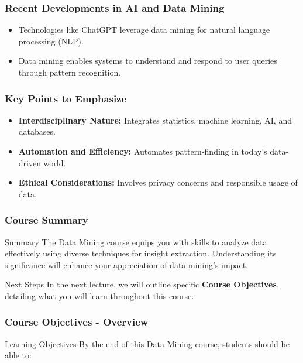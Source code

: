 \documentclass[aspectratio=169]{beamer}
\begin{document}
\begin{frame}[fragile]
    \frametitle{Recent Developments in AI and Data Mining}
    \begin{itemize}
        \item Technologies like ChatGPT leverage data mining for natural language processing (NLP).
        \item Data mining enables systems to understand and respond to user queries through pattern recognition.
    \end{itemize}
\end{frame}

\begin{frame}[fragile]
    \frametitle{Key Points to Emphasize}
    \begin{itemize}
        \item \textbf{Interdisciplinary Nature:} Integrates statistics, machine learning, AI, and databases.
        \item \textbf{Automation and Efficiency:} Automates pattern-finding in today's data-driven world.
        \item \textbf{Ethical Considerations:} Involves privacy concerns and responsible usage of data.
    \end{itemize}
\end{frame}

\begin{frame}[fragile]
    \frametitle{Course Summary}
    \begin{block}{Summary}
        The Data Mining course equips you with skills to analyze data effectively using diverse techniques for insight extraction. Understanding its significance will enhance your appreciation of data mining's impact.
    \end{block}
    \begin{block}{Next Steps}
        In the next lecture, we will outline specific \textbf{Course Objectives}, detailing what you will learn throughout this course.
    \end{block}
\end{frame}

\begin{frame}[fragile]
    \frametitle{Course Objectives - Overview}
    \begin{block}{Learning Objectives}
        By the end of this Data Mining course, students should be able to:
    \end{block}
\end{frame}
\end{document}
